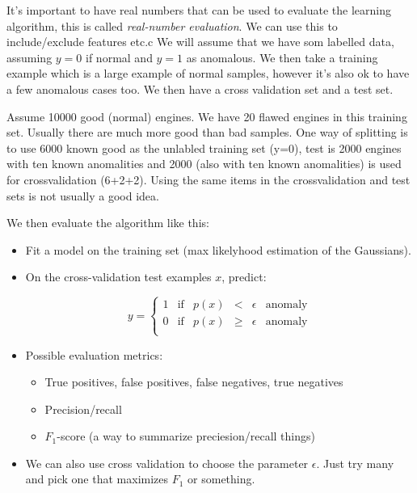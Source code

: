 \documentclass[a4, 12pt, english, USenglish]{scrreprt}
\newcommand{\idx}[1]{{\em #1}\index{#1}}
\begin{document}
It's important to have real numbers that can be used to evaluate the
learning algorithm, this is called \idx{real-number evaluation}.  We
can use this to include/exclude features etc.c We will assume that we
have som labelled data, assuming \(y=0\) if normal and \(y=1\) as
anomalous.  We then take a training example which is a large example
of normal samples, however it's also ok to have a few  anomalous cases
too. We then have a cross validation set and a test set. 

Assume 10000 good (normal) engines.  We have 20 flawed engines in this
training set. Usually there are much more good than bad samples.  One
way of splitting is to use 6000 known good as the unlabled training
set (y=0), test is 2000 engines with ten known anomalities and 2000
(also with ten known anomalities) is used for crossvalidation (6+2+2).
Using the same items in the crossvalidation and test sets is not
usually a good idea.

We then evaluate the algorithm like this:

\begin{itemize}

\item Fit a model on the training set (max likelyhood estimation of
  the Gaussians).

\item On the cross-validation test examples \(x\), predict:

\[
y = \left\{  
\begin{array}{lclcll}
1 &\mbox{if}& p(x) &<& \epsilon &\mbox{anomaly} \\
0 &\mbox{if}& p(x) &\geq& \epsilon &\mbox{anomaly} \\
\end{array}
\right.
\]
\item Possible  evaluation metrics:

\begin{itemize}
\item True positives, false positives, false negatives, true negatives
\item Precision/recall
\item \(F_1\)-score  (a way to summarize preciesion/recall things)
\end{itemize}

\item We can also use cross validation to choose the parameter
  \(\epsilon\).  Just try many and pick one that maximizes \(F_1\) or something.

\end{itemize}
\end{document}
